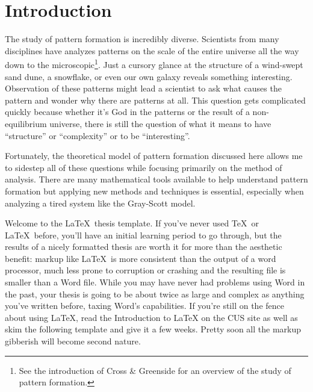 		
\chapter*{Introduction}

	The study of pattern formation is incredibly diverse. Scientists from many disciplines have analyzes patterns on the scale of the entire universe all the way down to the microscopic\footnote{See the introduction of Cross \& Greenside for an overview of the study of pattern formation.}. Just a cursory glance at the structure of a wind-swept sand dune, a snowflake, or even our own galaxy reveals something interesting. Observation of these patterns might lead a scientist to ask what causes the pattern and wonder why there are patterns at all. This question gets complicated quickly because whether it's God in the patterns or the result of a non-equilibrium universe, there is still the question of what it means to have ``structure'' or ``complexity'' or to be ``interesting''.
	
	Fortunately, the theoretical model of pattern formation discussed here allows me to sidestep all of these questions while focusing primarily on the method of analysis. There are many mathematical tools available to help understand pattern formation but applying new methods and techniques is essential, especially when analyzing a tired system like the Gray-Scott model.
	
	Welcome to the \LaTeX\ thesis template. If you've never used \TeX\ or \LaTeX\ before, you'll have an initial learning period to go through, but the results of a nicely formatted thesis are worth it for more than the aesthetic benefit: markup like \LaTeX\ is more consistent than the output of a word processor, much less prone to corruption or crashing and the resulting file is smaller than a Word file. While you may have never had problems using Word in the past, your thesis is going to be about twice as large and complex as anything you've written before, taxing Word's capabilities. If you're still on the fence about  using \LaTeX, read the Introduction to LaTeX on the CUS site as well as skim the following template and give it a few weeks. Pretty soon all the markup gibberish will become second nature.

